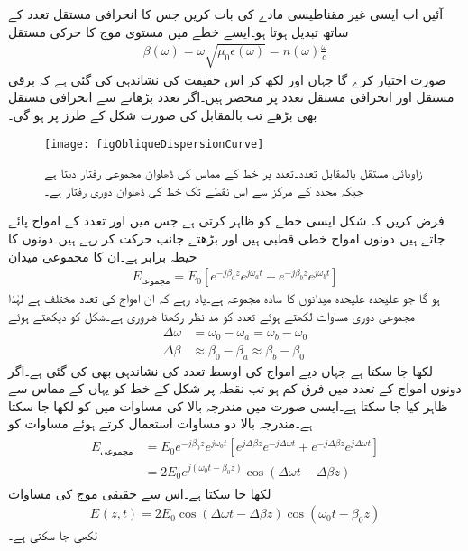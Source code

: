 آئیں اب ایسی غیر مقناطیسی مادے کی بات کریں جس کا انحرافی مستقل تعدد کے ساتھ تبدیل ہوتا ہو۔ایسے خطے میں مستوی موج کا حرکی مستقل
\begin{align}
\beta(\omega)=\omega\sqrt{\mu_0 \epsilon\left(\omega\right)}=n(\omega)\frac{\omega}{c}
\end{align}
صورت اختیار کرے گا جہاں  اور  لکھ کر اس حقیقت کی نشاندہی کی گئی ہے کہ برقی مستقل اور انحرافی مستقل تعدد پر منحصر ہیں۔اگر تعدد بڑھانے سے انحرافی مستقل  بھی بڑھے تب  بالمقابل  کی صورت شکل  کے طرز پر ہو گی۔
\begin{figure}
\centering
\texttt{[image: figObliqueDispersionCurve]}
\caption{زاویائی مستقل بالمقابل تعدد۔تعدد  پر خط کے مماس کی ڈھلوان مجموعی رفتار دیتا ہے جبکہ محدد کے مرکز سے اس نقطے تک خط کی ڈھلوان دوری رفتار ہے۔}
\label{شکل_ترچھی_حرکی_مستقل_بالمقابل_تعدد_خط}
\end{figure}

فرض کریں کہ شکل  ایسی خطے کو ظاہر کرتی ہے جس میں  اور  تعدد کے امواج پائے جاتے ہیں۔دونوں  امواج  خطی قطبی ہیں اور بڑھتے  جانب حرکت کر رہے ہیں۔دونوں کا حیطہ برابر ہے۔ان کا مجموعی میدان
\begin{align}\label{مساوات_ترچھی_انتشار_الف}
E_{\text{مجموعہ}}=E_0\left[e^{-j \beta_a z}e^{j \omega_a t}+e^{-j \beta_b z}e^{j \omega_b t}\right]
\end{align}
ہو گا جو علیحدہ علیحدہ میدانوں کا سادہ مجموعہ ہے۔یاد رہے کہ ان امواج کی تعدد مختلف ہے لہٰذا مجموعی دوری مساوات لکھتے ہوئے تعدد کو مد نظر رکھنا ضروری ہے۔شکل  کو دیکھتے ہوئے
\begin{align}
\Delta \omega&=\omega_0-\omega_a=\omega_b-\omega_0\\
\Delta \beta&\approx\beta_0-\beta_a\approx\beta_b-\beta_0
\end{align}
لکھا جا سکتا ہے جہاں دیے امواج کی اوسط تعدد  کی نشاندہی بھی کی گئی ہے۔اگر دونوں امواج کے تعدد میں فرق کم ہو تب نقطہ   پر شکل  کے خط کو یہاں کے مماس سے ظاہر کیا جا سکتا ہے۔ایسی صورت میں مندرجہ بالا   کی مساوات میں  کو  لکھا جا سکتا ہے۔مندرجہ بالا دو مساوات استعمال کرتے ہوئے مساوات  کو
\begin{gather}
\begin{aligned}
E_{\text{مجموعی}}&=E_0 e^{-j \beta_0 z} e^{j \omega_0 t}\left[e^{j \Delta \beta z} e^{-j \Delta \omega t}+e^{-j \Delta \beta z} e^{j \Delta \omega t}\right]\\
&=2 E_0 e^{j(\omega_0 t -\beta_0 z)} \cos(\Delta \omega t-\Delta \beta z)
\end{aligned}
\end{gather}
 لکھا جا سکتا ہے۔اس سے حقیقی موج کی مساوات
\begin{align}
E_{}(z,t)=2 E_0 \cos(\Delta \omega t-\Delta \beta z) \cos (\omega_0 t -\beta_0 z)
\end{align}
لکھی جا سکتی ہے۔

